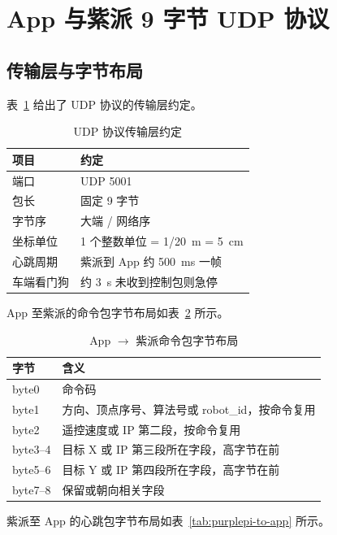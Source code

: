 \section{App 与紫派 9 字节 UDP 协议}
\label{sec:udp-protocol}

\subsection{传输层与字节布局}
\label{sec:udp-byte-layout}

表~\ref{tab:udp-transport} 给出了 UDP 协议的传输层约定。

\begin{table}[htbp]
\centering
\caption{UDP 协议传输层约定}
\label{tab:udp-transport}
\begin{tabular}{ll}
\toprule
\textbf{项目} & \textbf{约定} \\
\midrule
端口 & UDP 5001 \\
包长 & 固定 9 字节 \\
字节序 & 大端 / 网络序 \\
坐标单位 & 1 个整数单位 = 1/20~m = 5~cm \\
心跳周期 & 紫派到 App 约 500~ms 一帧 \\
车端看门狗 & 约 3~s 未收到控制包则急停 \\
\bottomrule
\end{tabular}
\end{table}

App 至紫派的命令包字节布局如表~\ref{tab:app-to-purplepi} 所示。

\begin{table}[htbp]
\centering
\caption{App $\to$ 紫派命令包字节布局}
\label{tab:app-to-purplepi}
\begin{tabular}{ll}
\toprule
\textbf{字节} & \textbf{含义} \\
\midrule
byte0 & 命令码 \\
byte1 & 方向、顶点序号、算法号或 robot\_id，按命令复用 \\
byte2 & 遥控速度或 IP 第二段，按命令复用 \\
byte3--4 & 目标 X 或 IP 第三段所在字段，高字节在前 \\
byte5--6 & 目标 Y 或 IP 第四段所在字段，高字节在前 \\
byte7--8 & 保留或朝向相关字段 \\
\bottomrule
\end{tabular}
\end{table}

紫派至 App 的心跳包字节布局如表~\ref{tab:purplepi-to-app} 所示。

